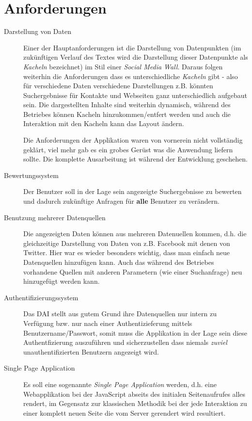 \documentclass[12pt,twoside]{book}
\begin{document}
\section*{Anforderungen}

\begin{description}

\item[Darstellung von Daten]

  Einer der Hauptanforderungen ist die Darstellung von Datenpunkten (im zukünftigen Verlauf des Textes wird die Darstellung dieser Datenpunkte als \textit{Kacheln} bezeichnet) im Stil einer \textit{Social Media Wall}. Daraus folgen weiterhin die Anforderungen dass es unterschiedliche \textit{Kacheln} gibt - also für verschiedene Daten verschiedene Darstellungen z.B. könnten Suchergebnisse für Kontakte und Webseiten ganz unterschiedlich aufgebaut sein. Die dargestellten Inhalte sind weiterhin dynamisch, während des Betriebes können Kacheln hinzukommen/entfert werden und auch die Interaktion mit den Kacheln kann das Layout ändern.

Die Anforderungen der Applikation waren von vornerein nicht vollständig geklärt, viel mehr gab es ein grobes Gerüst was die Anwendung liefern sollte. Die komplette Ausarbeitung ist während der Entwicklung geschehen.

\item[Bewertungssystem]

  Der Benutzer soll in der Lage sein angezeigte Suchergebnisse zu bewerten und dadurch zukünftige Anfragen für \textbf{alle} Benutzer zu verändern.

\item[Benutzung mehrerer Datenquellen]
  Die angezeigten Daten können aus mehreren Datenuellen kommen, d.h. die gleichzeitige Darstellung von Daten von z.B. Facebook mit denen von Twitter. Hier war es wieder besonders wichtig, dass man einfach neue Datenquellen hinzufügen kann. Auch das während des Betriebes vorhandene Quellen mit anderen Parametern (wie einer Suchanfrage) neu hinzugefügt werden kann.

\item[Authentifizierungssystem]
  Das DAI stellt aus gutem Grund ihre Datenquellen nur intern zu Verfügung bzw. nur nach einer Authentizieferung mittels Benutzername/Passwort, somit muss die Applikation in der Lage sein diese Authentfizierung auszuführen und sicherzustellen dass niemals \textit{zuviel} unauthentifizierten Benutzern angezeigt wird.

\item[Single Page Application]
  Es soll eine sogenannte \textit{Single Page Application} werden, d.h. eine Webapplikation bei der JavaScript abseits des initialen Seitenaufrufes alles rendert, im Gegensatz zur klassischen Methodik bei der jede Interaktion zu einer komplett neuen Seite die vom Server gerendert wird resultiert.


\end{description}
\end{document}
